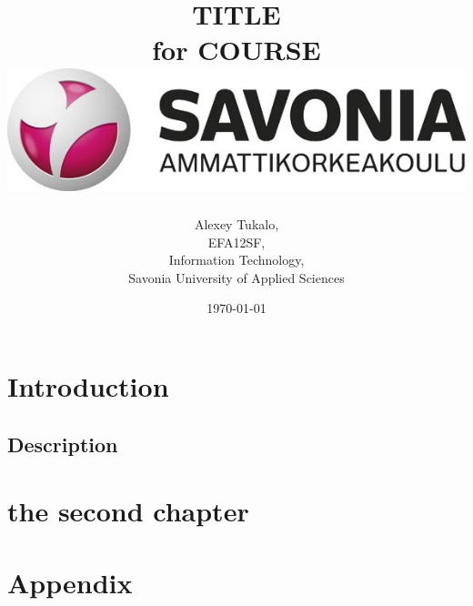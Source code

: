 \documentclass[english]{article}
\date{}
\begin{document}
\title{\vspace{2in}TITLE\\
\small for COURSE\\
\vspace{0.5in}\includegraphics{savonia.jpg}}

\nopagebreak
\maketitle


\vspace{3in}

\author{
\begin{flushright}
Alexey Tukalo,\\
EFA12SF,\\
Information Technology,\\
Savonia University of Applied Sciences
\end{flushright}
}

\date{\today}
\thispagestyle{empty}

\newpage
\setcounter{page}{1}
\setcounter{tocdepth}{2}
\tableofcontents

\newpage


\section{Introduction}


\subsection{Description}

\section{the second chapter}

\newpage
\section{Appendix}
\end{document}
